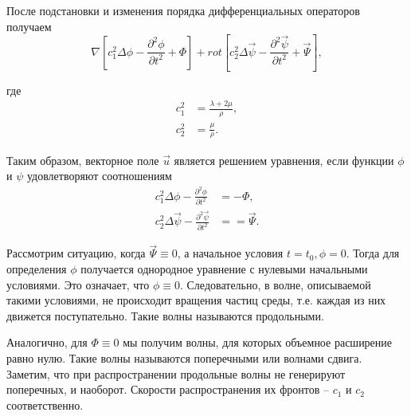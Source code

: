 После подстановки и изменения порядка дифференциальных операторов получаем
\begin{equation}
\nabla[c_1^2\Delta\phi - \frac{\partial^2 \phi}{\partial t^2} + \Phi] + rot[c_2^2\Delta\vec{\psi} - \frac{\partial^2 \vec{\psi}}{\partial t^2} + \vec{\Psi}],
\end{equation}

где 
\begin{align}
c_1^2 &= \frac{\lambda+2\mu}{\rho}, \nonumber\\
c_2^2 &= \frac{\mu}{\rho}.
\end{align}

Таким образом, векторное поле $\vec{u}$ является решением уравнения, если функции $\phi$ и $\psi$ удовлетворяют соотношениям
\begin{align}
c_1^2\Delta\phi - \frac{\partial^2 \phi}{\partial t^2} &= -\Phi, \\
c_2^2\Delta\vec{\psi} - \frac{\partial^2 \vec{\psi}}{\partial t^2} &= =\vec{\Psi}.
\end{align}

Рассмотрим ситуацию, когда $\vec{\Psi} \equiv 0$, а начальное условия $t = t_0, \phi = 0$. Тогда для определения $\phi$ получается однородное уравнение с нулевыми начальными условиями. Это означает, что $\phi \equiv 0$. Следовательно, в волне, описываемой такими условиями, не происходит вращения частиц среды, т.е. каждая из них движется поступательно. Такие волны называются продольными.

Аналогично, для $\Phi \equiv 0$ мы получим волны, для которых объемное расширение равно нулю. Такие волны называются поперечными или волнами сдвига. Заметим, что при распространении продольные волны не генерируют поперечных, и наоборот. Скорости распространения их фронтов -- $c_1$ и $c_2$ соответственно.

\clearpage
\newpage

